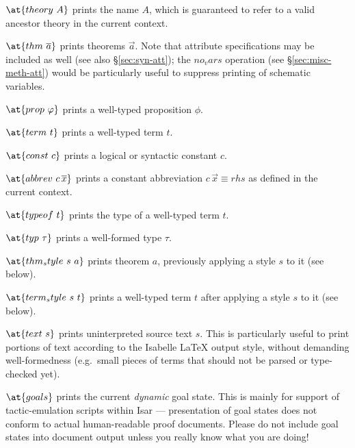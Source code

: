 \begin{descr}
  
\item [$\at\{theory~A\}$] prints the name $A$, which is guaranteed to
  refer to a valid ancestor theory in the current context.

\item [$\at\{thm~\vec a\}$] prints theorems $\vec a$. Note that attribute
  specifications may be included as well (see also \S\ref{sec:syn-att}); the
  $no_vars$ operation (see \S\ref{sec:misc-meth-att}) would be particularly
  useful to suppress printing of schematic variables.

\item [$\at\{prop~\phi\}$] prints a well-typed proposition $\phi$.

\item [$\at\{term~t\}$] prints a well-typed term $t$.

\item [$\at\{const~c\}$] prints a logical or syntactic constant $c$.
  
\item [$\at\{abbrev~c\,\vec x\}$] prints a constant abbreviation
  $c\,\vec x \equiv rhs$ as defined in the current context.

\item [$\at\{typeof~t\}$] prints the type of a well-typed term $t$.

\item [$\at\{typ~\tau\}$] prints a well-formed type $\tau$.
  
\item [$\at\{thm_style~s~a\}$] prints theorem $a$, previously applying a style
  $s$ to it (see below).
  
\item [$\at\{term_style~s~t\}$] prints a well-typed term $t$ after applying a
  style $s$ to it (see below).

\item [$\at\{text~s\}$] prints uninterpreted source text $s$.  This is
  particularly useful to print portions of text according to the Isabelle
  {\LaTeX} output style, without demanding well-formedness (e.g.\ small pieces
  of terms that should not be parsed or type-checked yet).

\item [$\at\{goals\}$] prints the current \emph{dynamic} goal state.  This is
  mainly for support of tactic-emulation scripts within Isar --- presentation
  of goal states does not conform to actual human-readable proof documents.
  Please do not include goal states into document output unless you really
  know what you are doing!
  

\end{descr}

